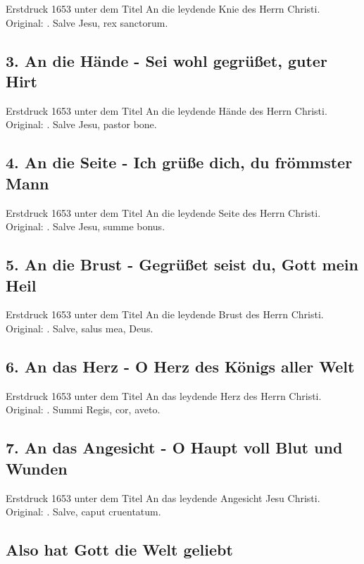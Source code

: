 Erstdruck 1653 unter dem Titel \frqq An die leydende Knie des Herrn Christi\flqq .
Original: . Salve Jesu, rex sanctorum\flqq .

\subsection*{ 3. An die Hände - Sei wohl gegrüßet, guter Hirt}

Erstdruck 1653 unter dem Titel \frqq An die leydende Hände des Herrn
Christi\flqq . Original: . Salve Jesu, pastor bone\flqq .

\subsection*{ 4. An die Seite - Ich grüße dich, du frömmster Mann}

Erstdruck 1653 unter dem Titel \frqq An die leydende Seite des Herrn
Christi\flqq . Original: . Salve Jesu, summe bonus\flqq .

\subsection*{ 5. An die Brust - Gegrüßet seist du, Gott mein Heil}

Erstdruck 1653 unter dem Titel \frqq An die leydende Brust des Herrn
Christi\flqq . Original: . Salve, salus mea, Deus\flqq .

\subsection*{ 6. An das Herz - O Herz des Königs aller Welt}

Erstdruck 1653 unter dem Titel \frqq An das leydende Herz des Herrn Christi\flqq .
Original: . Summi Regis, cor, aveto\flqq .

\subsection*{ 7. An das Angesicht - O Haupt voll Blut und Wunden}

Erstdruck 1653 unter dem Titel \frqq An das leydende Angesicht Jesu Christi\flqq .
Original: . Salve, caput cruentatum\flqq .

\subsection*{ Also hat Gott die Welt geliebt}


